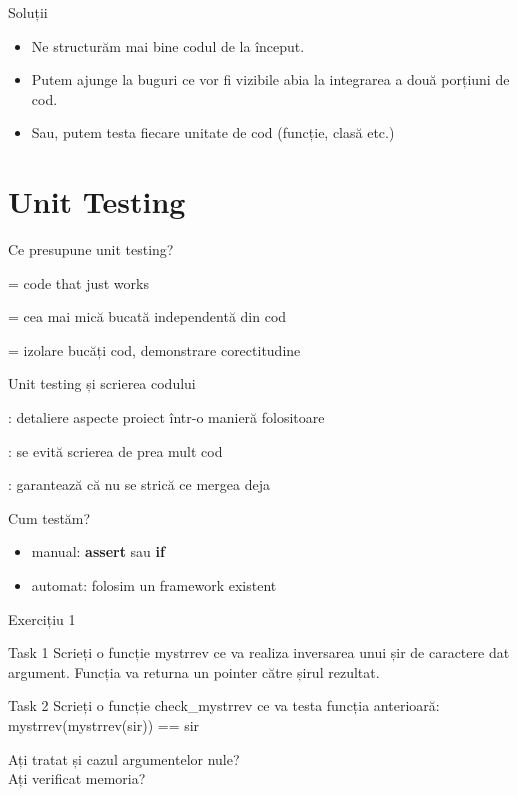 \documentclass{beamer}
\begin{document}
\begin{frame}{Soluții}
  \begin{itemize}[<+->]
    \item Ne structurăm mai bine codul de la început.
    \item Putem ajunge la buguri ce vor fi vizibile abia la integrarea a două
    porțiuni de cod.
    \item Sau, putem testa fiecare unitate de cod (funcție, clasă etc.)
  \end{itemize}
\end{frame}

\section{Unit Testing}

\begin{frame}{Ce presupune unit testing?}
  \begin{description}[<+->]
    \item[garanție]  = code that just works
    \item[unitate] = cea mai mică bucată independentă din cod
    \item[scop] = izolare bucăți cod, demonstrare corectitudine
  \end{description}
\end{frame}

\begin{frame}{Unit testing și scrierea codului}
  \begin{description}[<+->]
    \item[ÎNAINTE] : detaliere aspecte proiect într-o manieră folositoare
    \item[SCRIERE] : se evită scrierea de prea mult cod
    \item[MODIFICARE] : garantează că nu se strică ce mergea deja
  \end{description}
\end{frame}

\begin{frame}{Cum testăm?}
  \begin{itemize}[<+->]
    \item manual: \textbf{assert} sau \textbf{if}
    \item automat: folosim un framework existent
  \end{itemize}
\end{frame}

\begin{frame}{Exercițiu 1}
  \begin{alertblock}{Task 1}
    Scrieți o funcție mystrrev ce va realiza inversarea unui șir de caractere
    dat argument. Funcția va returna un pointer către șirul rezultat.
  \end{alertblock}
  \pause
  \begin{exampleblock}{Task 2}
    Scrieți o funcție check\_mystrrev ce va testa funcția anterioară:\\
    mystrrev(mystrrev(sir)) == sir
  \end{exampleblock}
  \pause
  Ați tratat și cazul argumentelor nule?\\
  \pause
  Ați verificat memoria?
\end{frame}
\end{document}
